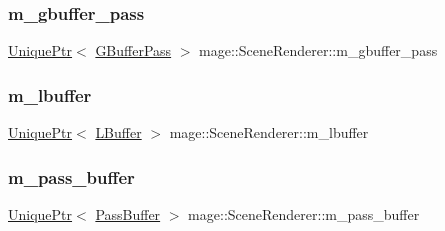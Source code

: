 \hypertarget{classmage_1_1_scene_renderer_a7892cf0b6e53a8d1a5cef1b81353d77a}{}\label{classmage_1_1_scene_renderer_a7892cf0b6e53a8d1a5cef1b81353d77a} 
\subsubsection{\texorpdfstring{m\+\_\+gbuffer\+\_\+pass}{m\_gbuffer\_pass}}
{\footnotesize\ttfamily \hyperlink{namespacemage_a3316d7143a973e37adf1110f2e80ca31}{Unique\+Ptr}$<$ \hyperlink{classmage_1_1_g_buffer_pass}{G\+Buffer\+Pass} $>$ mage\+::\+Scene\+Renderer\+::m\+\_\+gbuffer\+\_\+pass\hspace{0.3cm}{\ttfamily [private]}}

\hypertarget{classmage_1_1_scene_renderer_a161937c096a625d701498202d82e8ed7}{}\label{classmage_1_1_scene_renderer_a161937c096a625d701498202d82e8ed7} 
\subsubsection{\texorpdfstring{m\+\_\+lbuffer}{m\_lbuffer}}
{\footnotesize\ttfamily \hyperlink{namespacemage_a3316d7143a973e37adf1110f2e80ca31}{Unique\+Ptr}$<$ \hyperlink{structmage_1_1_l_buffer}{L\+Buffer} $>$ mage\+::\+Scene\+Renderer\+::m\+\_\+lbuffer\hspace{0.3cm}{\ttfamily [private]}}

\hypertarget{classmage_1_1_scene_renderer_a9801d415ee0113f9d2a53802df0cb7ba}{}\label{classmage_1_1_scene_renderer_a9801d415ee0113f9d2a53802df0cb7ba} 
\subsubsection{\texorpdfstring{m\+\_\+pass\+\_\+buffer}{m\_pass\_buffer}}
{\footnotesize\ttfamily \hyperlink{namespacemage_a3316d7143a973e37adf1110f2e80ca31}{Unique\+Ptr}$<$ \hyperlink{structmage_1_1_pass_buffer}{Pass\+Buffer} $>$ mage\+::\+Scene\+Renderer\+::m\+\_\+pass\+\_\+buffer\hspace{0.3cm}{\ttfamily [private]}}

